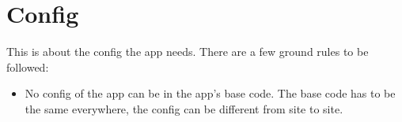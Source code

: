 \section*{Config}
This is about the config the app needs.
There are a few ground rules to be followed:

\begin{itemize}
\item No config of the app can be in the app's base code. The base code has to be the same everywhere, the config can be different from site to site.
\end{itemize}

